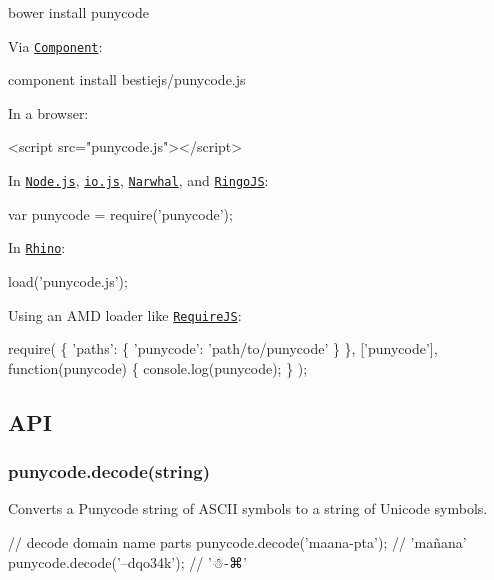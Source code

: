 \begin{DoxyCode}
bower install punycode
\end{DoxyCode}


Via \href{https://github.com/component/component}{\tt Component}\+:


\begin{DoxyCode}
component install bestiejs/punycode.js
\end{DoxyCode}


In a browser\+:


\begin{DoxyCode}
<script src="punycode.js"></script>
\end{DoxyCode}


In \href{https://nodejs.org/}{\tt Node.\+js}, \href{https://iojs.org/}{\tt io.\+js}, \href{http://narwhaljs.org/}{\tt Narwhal}, and \href{http://ringojs.org/}{\tt Ringo\+JS}\+:


\begin{DoxyCode}
var punycode = require('punycode');
\end{DoxyCode}


In \href{http://www.mozilla.org/rhino/}{\tt Rhino}\+:


\begin{DoxyCode}
load('punycode.js');
\end{DoxyCode}


Using an A\+MD loader like \href{http://requirejs.org/}{\tt Require\+JS}\+:


\begin{DoxyCode}
require(
  \{
    'paths': \{
      'punycode': 'path/to/punycode'
    \}
  \},
  ['punycode'],
  function(punycode) \{
    console.log(punycode);
  \}
);
\end{DoxyCode}


\subsection*{A\+PI}

\subsubsection*{{\ttfamily punycode.\+decode(string)}}

Converts a Punycode string of A\+S\+C\+II symbols to a string of Unicode symbols.


\begin{DoxyCode}
// decode domain name parts
punycode.decode('maana-pta'); // 'mañana'
punycode.decode('--dqo34k'); // '☃-⌘'
\end{DoxyCode}


